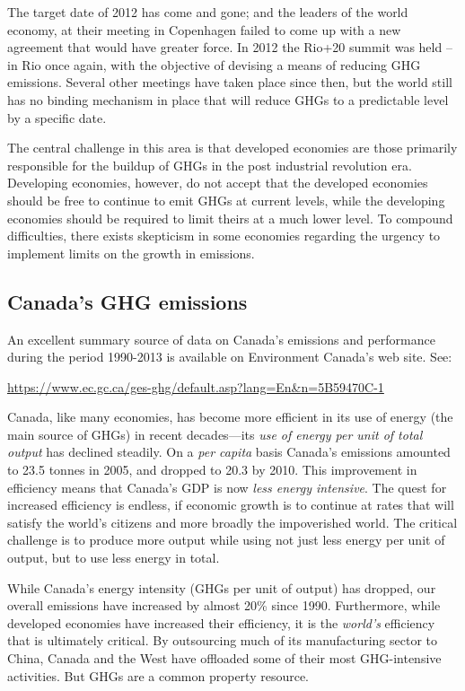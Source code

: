 The target date of 2012 has come and gone; and the leaders of the world
economy, at their meeting in Copenhagen failed to come up with a new
agreement that would have greater force. In 2012 the Rio+20 summit was held
-- in Rio once again, with the objective of devising a means of reducing GHG
emissions. Several other meetings have taken place since then, but the world
still has no binding mechanism in place that will reduce GHGs to a
predictable level by a specific date.

The central challenge in this area is that developed economies are those
primarily responsible for the buildup of GHGs in the post industrial
revolution era. Developing economies, however, do not accept that the
developed economies should be free to continue to emit GHGs at current
levels, while the developing economies should be required to limit theirs at
a much lower level. To compound difficulties, there exists skepticism in
some economies regarding the urgency to implement limits on the growth in
emissions.

\newhtmlpage

\subsection*{Canada's GHG emissions}

An excellent summary source of data on Canada's emissions and performance
during the period 1990-2013 is available on Environment Canada's web site.
See:

\url{https://www.ec.gc.ca/ges-ghg/default.asp?lang=En\&n=5B59470C-1}

Canada, like many economies, has become more efficient in its use of energy
(the main source of GHGs) in recent decades---its \textit{use of energy per
unit of total output} has declined steadily. On a \textit{per capita} basis
Canada's emissions amounted to 23.5 tonnes in 2005, and dropped to 20.3 by
2010. This improvement in efficiency means that Canada's GDP is now \textit{%
less energy intensive}. The quest for increased efficiency is endless, if
economic growth is to continue at rates that will satisfy the world's
citizens and more broadly the impoverished world. The critical challenge is
to produce more output while using not just less energy per unit of output,
but to use less energy in total.

While Canada's energy intensity (GHGs per unit of output) has dropped, our
overall emissions have increased by almost 20\% since 1990. Furthermore,
while developed economies have increased their efficiency, it is the \textit{%
world's} efficiency that is ultimately critical. By outsourcing much of its
manufacturing sector to China, Canada and the West have offloaded some of
their most GHG-intensive activities. But GHGs are a common property resource.

